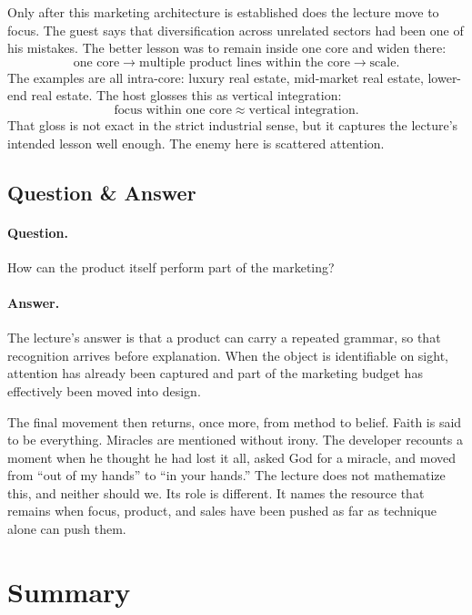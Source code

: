 Only after this marketing architecture is established does the lecture move to focus. The guest says that diversification across unrelated sectors had been one of his mistakes. The better lesson was to remain inside one core and widen there:
\begin{equation}
\text{one core} \to \text{multiple product lines within the core} \to \text{scale}.
\end{equation}
The examples are all intra-core: luxury real estate, mid-market real estate, lower-end real estate. The host glosses this as vertical integration:
\begin{equation}
\text{focus within one core} \approx \text{vertical integration}.
\end{equation}
That gloss is not exact in the strict industrial sense, but it captures the lecture's intended lesson well enough. The enemy here is scattered attention.

\subsection{Question \& Answer}

\paragraph{Question.} How can the product itself perform part of the marketing?

\paragraph{Answer.} The lecture's answer is that a product can carry a repeated grammar, so that recognition arrives before explanation. When the object is identifiable on sight, attention has already been captured and part of the marketing budget has effectively been moved into design.

The final movement then returns, once more, from method to belief. Faith is said to be everything. Miracles are mentioned without irony. The developer recounts a moment when he thought he had lost it all, asked God for a miracle, and moved from ``out of my hands'' to ``in your hands.'' The lecture does not mathematize this, and neither should we. Its role is different. It names the resource that remains when focus, product, and sales have been pushed as far as technique alone can push them.

\section{Summary}

